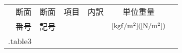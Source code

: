{\footnotesize
\begin{tabular}{r r r r r r r r} \toprule
    断面 & 断面 & 項目 & 内訳 & \multicolumn{3}{c}{単位重量} \\
    番号 & 記号 &      & & \multicolumn{3}{c}{${\rm [kgf/m^2]([N/m^2])}$} \\ \midrule
{{.table3}}
\end{tabular}\\
}
\newpage
